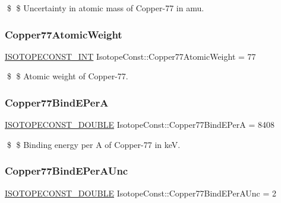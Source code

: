 \$ \$ Uncertainty in atomic mass of Copper-\/77 in amu. \mbox{\label{group___isotope_const-_copper-_cu77_gac9554da8b690f00e4e6122b02e0f5105}} 
\subsubsection{\texorpdfstring{Copper77\+Atomic\+Weight}{Copper77AtomicWeight}}
{\footnotesize\ttfamily \mbox{\hyperlink{group___isotope_const-_macros_ga5f18360b3e99483a35c32d789e62621c}{I\+S\+O\+T\+O\+P\+E\+C\+O\+N\+S\+T\+\_\+\+I\+NT}} Isotope\+Const\+::\+Copper77\+Atomic\+Weight = 77}

\$ \$ Atomic weight of Copper-\/77. \mbox{\label{group___isotope_const-_copper-_cu77_ga52135cba5fb596a980d29b66c60c9e65}} 
\subsubsection{\texorpdfstring{Copper77\+Bind\+E\+PerA}{Copper77BindEPerA}}
{\footnotesize\ttfamily \mbox{\hyperlink{group___isotope_const-_macros_ga8f45a7272ce02c0b4c65c44636ed719a}{I\+S\+O\+T\+O\+P\+E\+C\+O\+N\+S\+T\+\_\+\+D\+O\+U\+B\+LE}} Isotope\+Const\+::\+Copper77\+Bind\+E\+PerA = 8408}

\$ \$ Binding energy per A of Copper-\/77 in keV. \mbox{\label{group___isotope_const-_copper-_cu77_ga2490aad2e2027a9c2acd1ee09624af93}} 
\subsubsection{\texorpdfstring{Copper77\+Bind\+E\+Per\+A\+Unc}{Copper77BindEPerAUnc}}
{\footnotesize\ttfamily \mbox{\hyperlink{group___isotope_const-_macros_ga8f45a7272ce02c0b4c65c44636ed719a}{I\+S\+O\+T\+O\+P\+E\+C\+O\+N\+S\+T\+\_\+\+D\+O\+U\+B\+LE}} Isotope\+Const\+::\+Copper77\+Bind\+E\+Per\+A\+Unc = 2}

